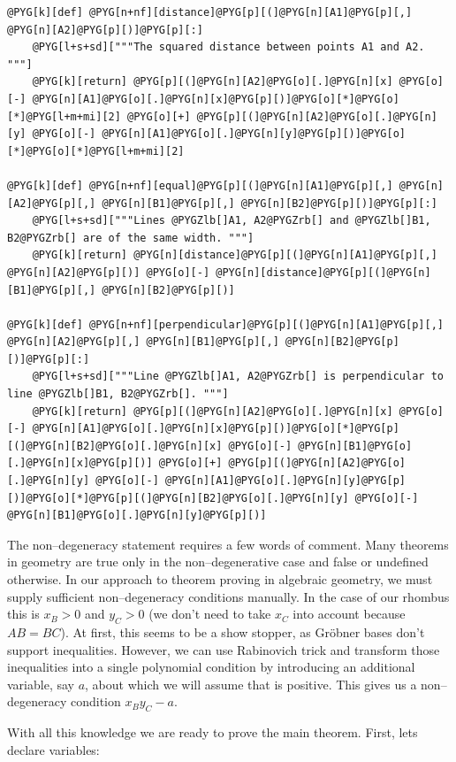 \begin{Verbatim}[commandchars=@\[\]]
@PYG[k][def] @PYG[n+nf][distance]@PYG[p][(]@PYG[n][A1]@PYG[p][,] @PYG[n][A2]@PYG[p][)]@PYG[p][:]
    @PYG[l+s+sd]["""The squared distance between points A1 and A2. """]
    @PYG[k][return] @PYG[p][(]@PYG[n][A2]@PYG[o][.]@PYG[n][x] @PYG[o][-] @PYG[n][A1]@PYG[o][.]@PYG[n][x]@PYG[p][)]@PYG[o][*]@PYG[o][*]@PYG[l+m+mi][2] @PYG[o][+] @PYG[p][(]@PYG[n][A2]@PYG[o][.]@PYG[n][y] @PYG[o][-] @PYG[n][A1]@PYG[o][.]@PYG[n][y]@PYG[p][)]@PYG[o][*]@PYG[o][*]@PYG[l+m+mi][2]

@PYG[k][def] @PYG[n+nf][equal]@PYG[p][(]@PYG[n][A1]@PYG[p][,] @PYG[n][A2]@PYG[p][,] @PYG[n][B1]@PYG[p][,] @PYG[n][B2]@PYG[p][)]@PYG[p][:]
    @PYG[l+s+sd]["""Lines @PYGZlb[]A1, A2@PYGZrb[] and @PYGZlb[]B1, B2@PYGZrb[] are of the same width. """]
    @PYG[k][return] @PYG[n][distance]@PYG[p][(]@PYG[n][A1]@PYG[p][,] @PYG[n][A2]@PYG[p][)] @PYG[o][-] @PYG[n][distance]@PYG[p][(]@PYG[n][B1]@PYG[p][,] @PYG[n][B2]@PYG[p][)]

@PYG[k][def] @PYG[n+nf][perpendicular]@PYG[p][(]@PYG[n][A1]@PYG[p][,] @PYG[n][A2]@PYG[p][,] @PYG[n][B1]@PYG[p][,] @PYG[n][B2]@PYG[p][)]@PYG[p][:]
    @PYG[l+s+sd]["""Line @PYGZlb[]A1, A2@PYGZrb[] is perpendicular to line @PYGZlb[]B1, B2@PYGZrb[]. """]
    @PYG[k][return] @PYG[p][(]@PYG[n][A2]@PYG[o][.]@PYG[n][x] @PYG[o][-] @PYG[n][A1]@PYG[o][.]@PYG[n][x]@PYG[p][)]@PYG[o][*]@PYG[p][(]@PYG[n][B2]@PYG[o][.]@PYG[n][x] @PYG[o][-] @PYG[n][B1]@PYG[o][.]@PYG[n][x]@PYG[p][)] @PYG[o][+] @PYG[p][(]@PYG[n][A2]@PYG[o][.]@PYG[n][y] @PYG[o][-] @PYG[n][A1]@PYG[o][.]@PYG[n][y]@PYG[p][)]@PYG[o][*]@PYG[p][(]@PYG[n][B2]@PYG[o][.]@PYG[n][y] @PYG[o][-] @PYG[n][B1]@PYG[o][.]@PYG[n][y]@PYG[p][)]
\end{Verbatim}
\noindent
The non--degeneracy statement requires a few words of comment. Many theorems in geometry are true only
in the non--degenerative case and false or undefined otherwise. In our approach to theorem proving in
algebraic geometry, we must supply sufficient non--degeneracy conditions manually. In the case of our
rhombus this is $x_B > 0$ and $y_C > 0$ (we don't need to take $x_C$ into account because $AB = BC$).
At first, this seems to be a show stopper, as Gröbner bases don't support inequalities. However,
we can use Rabinovich trick and transform those inequalities into a single polynomial condition by
introducing an additional variable, say $a$, about which we will assume that is positive. This gives
us a non--degeneracy condition $x_B y_C - a$.

With all this knowledge we are ready to prove the main theorem. First, lets declare variables:

